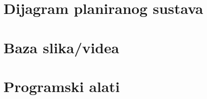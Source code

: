 \documentclass[times, utf8, seminar, numeric]{fer}
\begin{document}
\chapter{Dijagram planiranog sustava}

\chapter{Baza slika/videa}

\chapter{Programski alati}

%
%

\begin{comment}
\begin{sazetak}
Simbolička regresija je postupak otkrivanja matematičkog izraza u skupu podataka. Daje se pregled metoda za simboličku regresiju s naglaskom na genetsko programiranje. Obrađuju se problemi kao što su domene funkcija (nisu definirane na cijelom skupu realnih brojeva). Problemi se rješavaju intervalnom aritmetikom i linearnim skaliranjem. Na kraju se ukratko opisuje mogućnost paralelizacije i primjene. 

\kljucnerijeci{genetsko programiranje, s}

\end{sazetak}

\engtitle{Application of graphics coprocessors for program execution on stream programming model}

\begin{abstract}


\keywords{GPU, StreamIt, Sponge, StreamGate, CUDA, stream model, filter, optimization, graphics card}
\end{abstract}
\end{comment}
\end{document}
